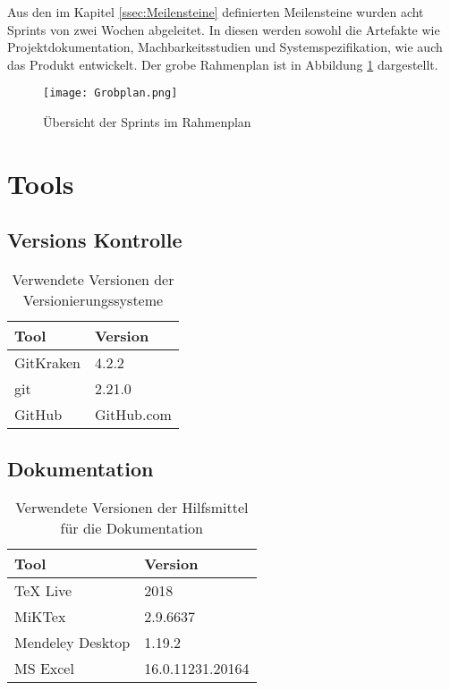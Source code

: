 Aus den im Kapitel \ref{ssec:Meilensteine} definierten Meilensteine wurden acht Sprints von zwei Wochen abgeleitet. In diesen werden sowohl die Artefakte wie Projektdokumentation, Machbarkeitsstudien und Systemspezifikation, wie auch das Produkt entwickelt. Der grobe Rahmenplan ist in Abbildung \ref{fig:Rahmenplan_1} dargestellt.

\begin{figure}[h!]
	\centering
	\texttt{[image: Grobplan.png]}
	\caption{Übersicht der Sprints im Rahmenplan}
	\label{fig:Rahmenplan_1}
\end{figure}

\newpage

\section{Tools}
\label{sec:Tools}

\subsection{Versions Kontrolle}
\begin{table}[h!]
	\begin{tabular}{p{} p{}}
		\hline
		\textbf{Tool} & \textbf{Version} \\
		\hline
		GitKraken & 4.2.2 \\
		\hline
		git & 2.21.0 \\
		\hline
		GitHub & GitHub.com \\
		\hline
	\end{tabular}
	\caption{Verwendete Versionen der Versionierungssysteme}
\end{table}

\subsection{Dokumentation}
\begin{table}[h!]
	\begin{tabular}{p{} p{}}
		\hline
		\textbf{Tool} & \textbf{Version} \\
		\hline
		TeX Live & 2018 \\
		\hline
		MiKTex & 2.9.6637 \\
		\hline
		Mendeley Desktop & 1.19.2 \\
		\hline
		MS Excel & 16.0.11231.20164 \\
		\hline
	\end{tabular}
	\caption{Verwendete Versionen der Hilfsmittel für die Dokumentation}
\end{table}



